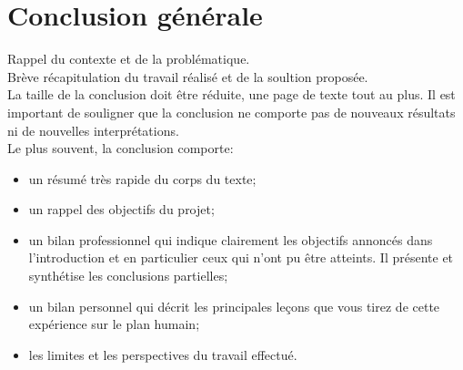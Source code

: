 \chapter*{Conclusion générale}

Rappel du contexte et de la problématique.\\
Brève récapitulation du travail réalisé et de la soultion proposée.\\

La taille de la conclusion doit être réduite, une page de texte tout au plus. Il est important de souligner que la conclusion ne comporte pas de nouveaux résultats ni de nouvelles interprétations.\\

Le plus souvent, la conclusion comporte:

\begin{itemize}[label=\textbullet,font=\normalsize]
\item un résumé très rapide du corps du texte;
\item un rappel des objectifs du projet;
\item un bilan professionnel qui indique clairement les objectifs annoncés dans l’introduction et en particulier ceux qui n’ont pu être atteints. Il présente et synthétise les conclusions partielles;
\item un bilan personnel qui décrit les principales leçons que vous tirez de cette expérience sur le plan humain;
\item les limites et les perspectives du travail effectué.
\end{itemize}